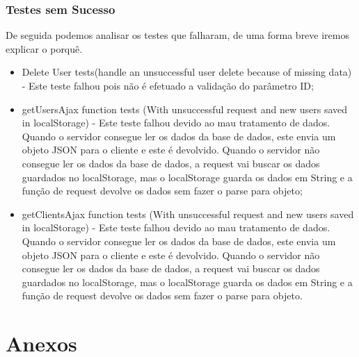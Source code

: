 \documentclass[a4paper,12pt]{article} %
\begin{document}
\subsubsection{Testes sem Sucesso}
De seguida podemos analisar os testes que falharam, de uma forma breve iremos explicar o porquê.
\begin{itemize}
	\item Delete User tests(handle an unsuccessful user delete because of missing data) - Este teste falhou pois não é efetuado a validação do parâmetro ID;
	\item getUsersAjax function tests (With unsuccessful request and new users saved in localStorage) - Este teste falhou devido ao mau tratamento de dados. Quando o servidor consegue ler os dados da base de dados, este envia um objeto JSON para o cliente e este é devolvido. Quando o servidor não consegue ler os dados da base de dados, a request vai buscar os dados guardados no localStorage, mas o localStorage guarda os dados em String e a função de request devolve os dados sem fazer o parse para objeto;
	\item getClientsAjax function tests (With unsuccessful request and new users saved in localStorage) - Este teste falhou devido ao mau tratamento de dados. Quando o servidor consegue ler os dados da base de dados, este envia um objeto JSON para o cliente e este é devolvido. Quando o servidor não consegue ler os dados da base de dados, a request vai buscar os dados guardados no localStorage, mas o localStorage guarda os dados em String e a função de request devolve os dados sem fazer o parse para objeto.
\end{itemize}

\newpage
\section{Anexos}

\end{document}
